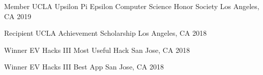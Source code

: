 



\begin{cvhonors}

\cvhonor
  {Member} %
  {UCLA Upsilon Pi Epsilon Computer Science Honor Society} %
  {Los Angeles, CA} %
  {2019} %

  \cvhonor
    {Recipient} %
    {UCLA Achievement Scholarship} %
    {Los Angeles, CA} %
    {2018} %

  \cvhonor
    {Winner} %
    {EV Hacks III Most Useful Hack} %
    {San Jose, CA} %
    {2018} %

  \cvhonor
    {Winner} %
    {EV Hacks III Best App} %
    {San Jose, CA} %
    {2018} %

\end{cvhonors}

